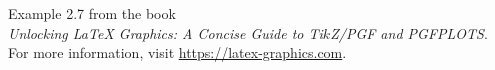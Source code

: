 \documentclass{article}
\begin{document}
Example 2.7 from the book\\
\emph{Unlocking LaTeX Graphics: A Concise Guide to Ti$k$Z/PGF and PGFPLOTS}.\\
For more information, visit \url{https://latex-graphics.com}.
\par\bigskip

\end{document}
